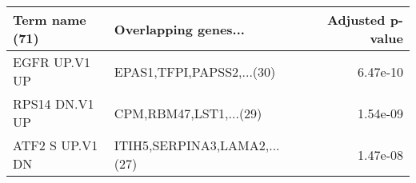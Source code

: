 \begin{tabular}{llr}
\toprule
 Term name (71) &         Overlapping genes... &  Adjusted p-value \\
\midrule
  EGFR UP.V1 UP &    EPAS1,TFPI,PAPSS2,...(30) &          6.47e-10 \\
 RPS14 DN.V1 UP &       CPM,RBM47,LST1,...(29) &          1.54e-09 \\
ATF2 S UP.V1 DN & ITIH5,SERPINA3,LAMA2,...(27) &          1.47e-08 \\
\bottomrule
\end{tabular}
